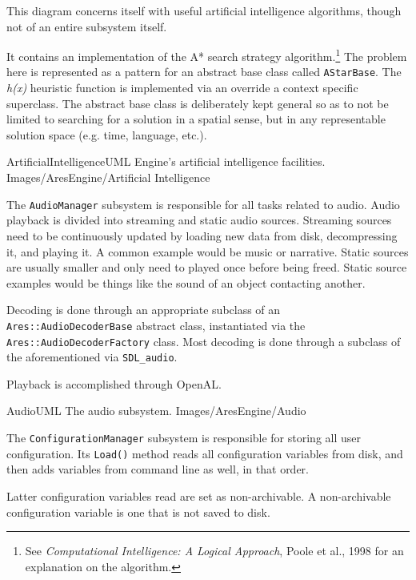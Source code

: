 This diagram concerns itself with useful artificial intelligence algorithms, though not of an entire subsystem itself.

It contains an implementation of the A* search strategy algorithm.\footnote{See {\it Computational Intelligence: A Logical Approach}, Poole et al., 1998 for an explanation on the algorithm.} The problem here is represented as a pattern for an abstract base class called {\tt AStarBase}. The {\it h(x)} heuristic function is implemented via an override a context specific superclass. The abstract base class is deliberately kept general so as to not be limited to searching for a solution in a spatial sense, but in any representable solution space (e.g. time, language, etc.).

\FullPageLandscapeDiagram
    {ArtificialIntelligenceUML}
    {Engine's artificial intelligence facilities.}
    {Images/AresEngine/Artificial Intelligence}

\page
{}
The {\tt AudioManager} subsystem is responsible for all tasks related to audio. Audio playback is divided into streaming and static audio sources. Streaming sources need to be continuously updated by loading new data from disk, decompressing it, and playing it. A common example would be music or narrative. Static sources are usually smaller and only need to played once before being freed. Static source examples would be things like the sound of an object contacting another.

Decoding is done through an appropriate subclass of an {\tt Ares::AudioDecoderBase} abstract class, instantiated via the {\tt Ares::AudioDecoderFactory} class. Most decoding is done through a subclass of the aforementioned via {\tt SDL_audio}.

Playback is accomplished through OpenAL.

\FullPageLandscapeDiagram
    {AudioUML}
    {The audio subsystem.}
    {Images/AresEngine/Audio}

\page
{}
The {\tt ConfigurationManager} subsystem is responsible for storing all user configuration. Its {\tt Load()} method reads all configuration variables from disk, and then adds variables from command line as well, in that order. 

Latter configuration variables read are set as non-archivable. A non-archivable configuration variable is one that is not saved to disk.


